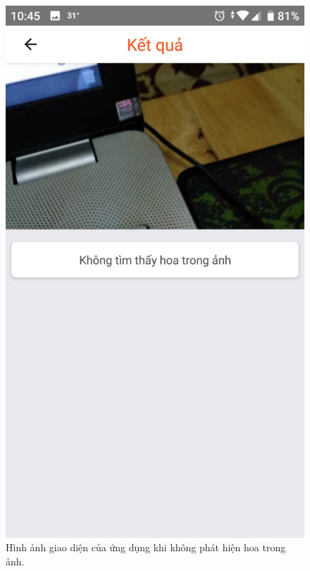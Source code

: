 \documentclass[12pt]{report}
\begin{document}
\begin{figure}[h]
			\includegraphics[scale=0.2]{app_no_flower2}
			\caption{Hình ảnh giao diện của ứng dụng khi không phát hiện hoa trong ảnh.}
			\label{fig:app_no_flower}
		\end{figure}
\end{document}

